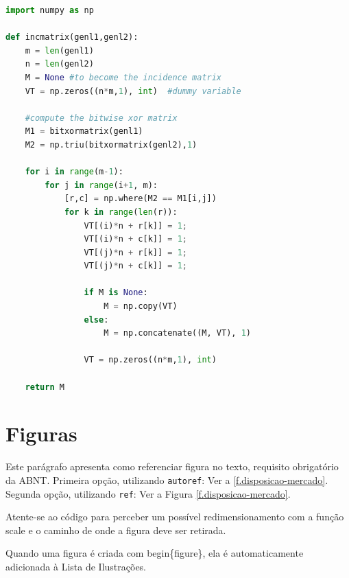 \begin{lstlisting}[language=Python, caption=Exemplo de código em Python]
import numpy as np
 
def incmatrix(genl1,genl2):
    m = len(genl1)
    n = len(genl2)
    M = None #to become the incidence matrix
    VT = np.zeros((n*m,1), int)  #dummy variable
 
    #compute the bitwise xor matrix
    M1 = bitxormatrix(genl1)
    M2 = np.triu(bitxormatrix(genl2),1) 
 
    for i in range(m-1):
        for j in range(i+1, m):
            [r,c] = np.where(M2 == M1[i,j])
            for k in range(len(r)):
                VT[(i)*n + r[k]] = 1;
                VT[(i)*n + c[k]] = 1;
                VT[(j)*n + r[k]] = 1;
                VT[(j)*n + c[k]] = 1;
 
                if M is None:
                    M = np.copy(VT)
                else:
                    M = np.concatenate((M, VT), 1)
 
                VT = np.zeros((n*m,1), int)
 
    return M
\end{lstlisting}


\section{Figuras}
\label{s.figuras}

Este parágrafo apresenta como referenciar figura no texto, requisito obrigatório da ABNT.
Primeira opção, utilizando \texttt{autoref}: Ver a \autoref{f.disposicao-mercado}. 
Segunda opção, utilizando  \texttt{ref}: Ver a Figura \ref{f.disposicao-mercado}.

Atente-se ao código para perceber um possível redimensionamento com a função scale e o caminho de onde a figura deve ser retirada.

Quando uma figura é criada com begin\{figure\}, ela é automaticamente adicionada à Lista de Ilustrações.

